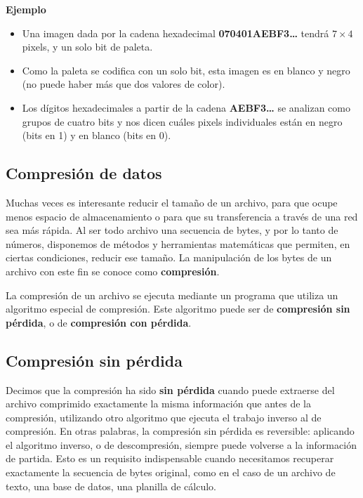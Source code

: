 \documentclass[spanish,a4paper,]{article}
\providecommand{\tightlist}{%
  \setlength{\itemsep}{0pt}\setlength{\parskip}{0pt}}
\begin{document}
\textbf{Ejemplo}

\begin{itemize}
\tightlist
\item
  Una imagen dada por la cadena hexadecimal \textbf{070401AEBF3\ldots{}}
  tendrá \(7 \times 4\) pixels, y un solo bit de paleta.
\item
  Como la paleta se codifica con un solo bit, esta imagen es en blanco y
  negro (no puede haber más que dos valores de color).
\item
  Los dígitos hexadecimales a partir de la cadena \textbf{AEBF3\ldots{}}
  se analizan como grupos de cuatro bits y nos dicen cuáles pixels
  individuales están en negro (bits en 1) y en blanco (bits en 0).
\end{itemize}

\hypertarget{compresiuxf3n-de-datos}{%
\subsection{Compresión de datos}\label{compresiuxf3n-de-datos}}

Muchas veces es interesante reducir el tamaño de un archivo, para que
ocupe menos espacio de almacenamiento o para que su transferencia a
través de una red sea más rápida. Al ser todo archivo una secuencia de
bytes, y por lo tanto de números, disponemos de métodos y herramientas
matemáticas que permiten, en ciertas condiciones, reducir ese tamaño. La
manipulación de los bytes de un archivo con este fin se conoce como
\textbf{compresión}.

La compresión de un archivo se ejecuta mediante un programa que utiliza
un algoritmo especial de compresión. Este algoritmo puede ser de
\textbf{compresión sin pérdida}, o de \textbf{compresión con pérdida}.

\hypertarget{compresiuxf3n-sin-puxe9rdida}{%
\subsection{Compresión sin pérdida}\label{compresiuxf3n-sin-puxe9rdida}}

Decimos que la compresión ha sido \textbf{sin pérdida} cuando puede
extraerse del archivo comprimido exactamente la misma información que
antes de la compresión, utilizando otro algoritmo que ejecuta el trabajo
inverso al de compresión. En otras palabras, la compresión sin pérdida
es reversible: aplicando el algoritmo inverso, o de descompresión,
siempre puede volverse a la información de partida. Esto es un requisito
indispensable cuando necesitamos recuperar exactamente la secuencia de
bytes original, como en el caso de un archivo de texto, una base de
datos, una planilla de cálculo.
\end{document}
